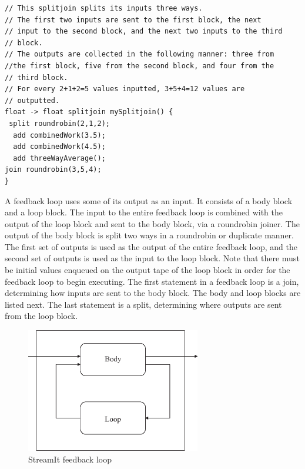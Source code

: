 \begin{scriptsize}
\begin{singlespace}
\begin{verbatim}
// This splitjoin splits its inputs three ways.
// The first two inputs are sent to the first block, the next
// input to the second block, and the next two inputs to the third
// block.
// The outputs are collected in the following manner: three from
//the first block, five from the second block, and four from the
// third block.
// For every 2+1+2=5 values inputted, 3+5+4=12 values are
// outputted.
float -> float splitjoin mySplitjoin() {
 split roundrobin(2,1,2);
  add combinedWork(3.5);
  add combinedWork(4.5);
  add threeWayAverage();
join roundrobin(3,5,4);
}
\end{verbatim}
\end{singlespace}
\end{scriptsize}

    A feedback loop uses some of its output as
an input. It consists of a body block and a loop block. The input
to the entire feedback loop is combined with the output of the
loop block and sent to the body block, via a roundrobin joiner.
The output of the body block is split two ways in a roundrobin or
duplicate manner.  The first set of outputs is used as the output
of the entire feedback loop, and the second set of outputs is used
as the input to the loop block. Note that there must be initial
values enqueued on the output tape of the loop block in order for
the feedback loop to begin executing. The first statement in a
feedback loop is a join, determining how inputs are sent to the
body block. The body and loop blocks are listed next. The last
statement is a split, determining where outputs are sent from the
loop block.

\begin{figure}[bthp]
  \centering
  \includegraphics[width=3.0in]{figures/feedback.eps}
  \caption{StreamIt feedback loop}
  \label{fig:feedback}
\end{figure}

